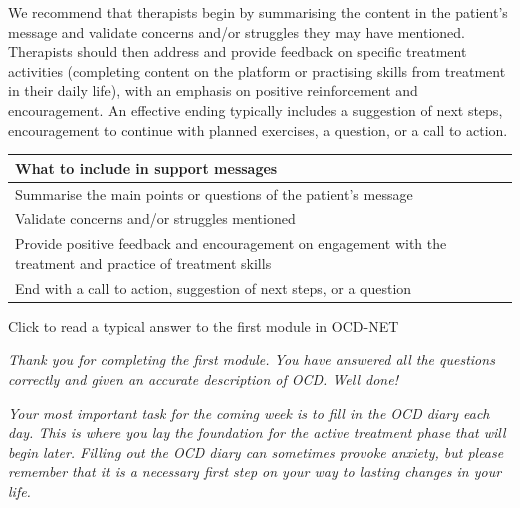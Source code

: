 \documentclass[]{book}
\begin{document}
We recommend that therapists begin by summarising the content in the patient's message and validate concerns and/or struggles they may have mentioned. Therapists should then address and provide feedback on specific treatment activities (completing content on the platform or practising skills from treatment in their daily life), with an emphasis on positive reinforcement and encouragement. An effective ending typically includes a suggestion of next steps, encouragement to continue with planned exercises, a question, or a call to action.

\begin{longtable}[]{@{}l@{}}
\toprule
\begin{minipage}[b]{0.97\columnwidth}\raggedright
\textbf{What to include in support messages}\strut
\end{minipage}\tabularnewline
\midrule
\endhead
\begin{minipage}[t]{0.97\columnwidth}\raggedright
Summarise the main points or questions of the patient's message\strut
\end{minipage}\tabularnewline
\begin{minipage}[t]{0.97\columnwidth}\raggedright
Validate concerns and/or struggles mentioned\strut
\end{minipage}\tabularnewline
\begin{minipage}[t]{0.97\columnwidth}\raggedright
Provide positive feedback and encouragement on engagement with the treatment and practice of treatment skills\strut
\end{minipage}\tabularnewline
\begin{minipage}[t]{0.97\columnwidth}\raggedright
End with a call to action, suggestion of next steps, or a question\strut
\end{minipage}\tabularnewline
\bottomrule
\end{longtable}

Click to read a typical answer to the first module in OCD-NET

\emph{Thank you for completing the first module. You have answered all the questions correctly and given an accurate description of OCD. Well done!}

\emph{Your most important task for the coming week is to fill in the OCD diary each day. This is where you lay the foundation for the active treatment phase that will begin later. Filling out the OCD diary can sometimes provoke anxiety, but please remember that it is a necessary first step on your way to lasting changes in your life.}
\end{document}
